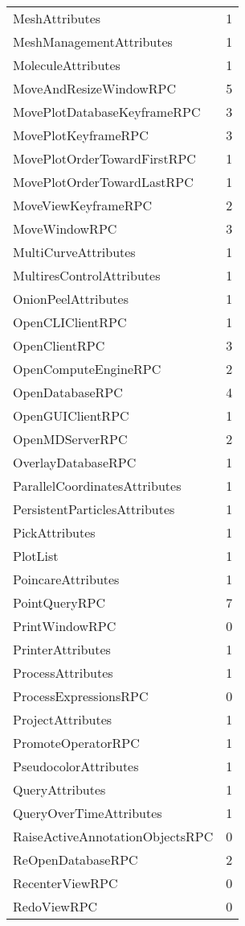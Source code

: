 \documentclass[10pt,a4paper]{report}
\begin{document}
\begin{longtable}{ll}
MeshAttributes & 1 \\
MeshManagementAttributes & 1 \\
MoleculeAttributes & 1 \\
MoveAndResizeWindowRPC & 5 \\
MovePlotDatabaseKeyframeRPC & 3 \\
MovePlotKeyframeRPC & 3 \\
MovePlotOrderTowardFirstRPC & 1 \\
MovePlotOrderTowardLastRPC & 1 \\
MoveViewKeyframeRPC & 2 \\
MoveWindowRPC & 3 \\
MultiCurveAttributes & 1 \\
MultiresControlAttributes & 1 \\
OnionPeelAttributes & 1 \\
OpenCLIClientRPC & 1 \\
OpenClientRPC & 3 \\
OpenComputeEngineRPC & 2 \\
OpenDatabaseRPC & 4 \\
OpenGUIClientRPC & 1 \\
OpenMDServerRPC & 2 \\
OverlayDatabaseRPC & 1 \\
ParallelCoordinatesAttributes & 1 \\
PersistentParticlesAttributes & 1 \\
PickAttributes & 1 \\
PlotList & 1 \\
PoincareAttributes & 1 \\
PointQueryRPC & 7 \\
PrintWindowRPC & 0 \\
PrinterAttributes & 1 \\
ProcessAttributes & 1 \\
ProcessExpressionsRPC & 0 \\
ProjectAttributes & 1 \\
PromoteOperatorRPC & 1 \\
PseudocolorAttributes & 1 \\
QueryAttributes & 1 \\
QueryOverTimeAttributes & 1 \\
RaiseActiveAnnotationObjectsRPC & 0 \\
ReOpenDatabaseRPC & 2 \\
RecenterViewRPC & 0 \\
RedoViewRPC & 0 \\

\end{longtable}
\end{document}
